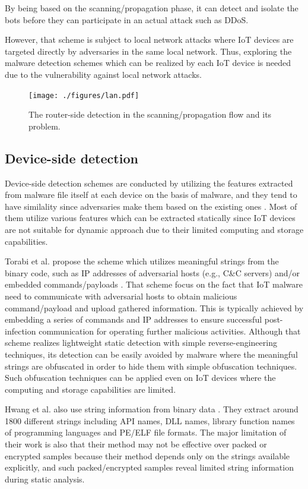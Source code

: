 \documentclass{ieeeaccess}
\begin{document}
By being based on the scanning/propagation phase, it can detect and isolate the bots before they can participate in an actual attack such as DDoS.

However, that scheme is subject to local network attacks where IoT devices are targeted directly by adversaries in the same local network.
Thus, exploring the malware detection schemes which can be realized by each IoT device is needed due to the vulnerability against local network attacks.

\begin{figure}[h]
 \centering
 \texttt{[image: ./figures/lan.pdf]}
 \caption{The router-side detection in the scanning/propagation flow and its problem.} 
 \label{fig:lan}
\end{figure}

\subsection{Device-side detection} 
Device-side detection schemes are conducted by utilizing the features extracted from malware file itself at each device on the basis of malware, and they tend to have similality since adversaries make them based on the existing ones \cite{om, hwang, cfg, cfg2}.
Most of them utilize various features which can be extracted statically since IoT devices are not suitable for dynamic approach due to their limited computing and storage capabilities.

Torabi et al. propose the scheme which utilizes meaningful strings from the binary code, such as IP addresses of adversarial hosts (e.g., C\&C servers) and/or embedded commands/payloads \cite{om}.
That scheme focus on the fact that IoT malware need to communicate with adversarial hosts to obtain malicious command/payload and upload gathered information.
This is typically achieved by embedding a series of commands and IP addresses to ensure successful post-infection communication for operating further malicious activities. 
Although that scheme realizes lightweight static detection with simple reverse-engineering techniques, its detection can be easily avoided by malware where the meaningful strings are obfuscated in order to hide them with simple obfuscation techniques.
Such obfuscation techniques can be applied even on IoT devices where the computing and storage capabilities are limited.

Hwang et al. also use string information from binary data \cite{hwang}.
They extract around 1800 different strings including API names, DLL names, library function names of programming languages and PE/ELF file formats.
The major limitation of their work is also that their method may not be effective over packed or encrypted samples because their method depends only on the strings available explicitly, and such packed/encrypted samples reveal limited string information during static analysis.
\end{document}
